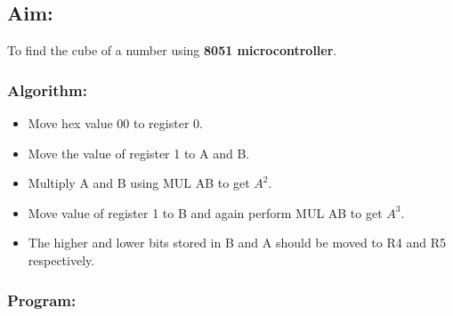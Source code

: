 \documentclass[12pt,a4paper]{article}
\begin{document}
\begin{flushleft}
\subsection*{\textbf{Aim:}} 
To find the cube of a number using \textbf{8051 microcontroller}.

\subsubsection*{\textbf{Algorithm:}}
\begin{itemize}
    \item Move hex value 00 to register 0. 
    \item Move the value of register 1 to A and B.
    \item Multiply A and B using MUL AB to get $A^2$.
    \item Move value of register 1 to B and again perform MUL AB to get $A^3$. 
    \item The higher and lower bits stored in B and A should be moved to R4 and R5 respectively.
\end{itemize}

\newpage
\subsubsection*{\textbf{Program:}}


\end{flushleft}
\end{document}
